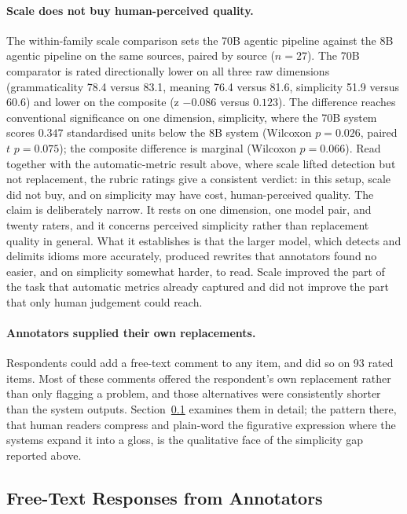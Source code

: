 \paragraph{Scale does not buy human-perceived quality.} The within-family scale comparison sets the 70B agentic pipeline against the 8B agentic pipeline on the same sources, paired by source ($n = 27$). The 70B comparator is rated directionally lower on all three raw dimensions (grammaticality 78.4 versus 83.1, meaning 76.4 versus 81.6, simplicity 51.9 versus 60.6) and lower on the composite (z $-0.086$ versus $0.123$). The difference reaches conventional significance on one dimension, simplicity, where the 70B system scores $0.347$ standardised units below the 8B system (Wilcoxon $p = 0.026$, paired $t$ $p = 0.075$); the composite difference is marginal (Wilcoxon $p = 0.066$). Read together with the automatic-metric result above, where scale lifted detection but not replacement, the rubric ratings give a consistent verdict: in this setup, scale did not buy, and on simplicity may have cost, human-perceived quality. The claim is deliberately narrow. It rests on one dimension, one model pair, and twenty raters, and it concerns perceived simplicity rather than replacement quality in general. What it establishes is that the larger model, which detects and delimits idioms more accurately, produced rewrites that annotators found no easier, and on simplicity somewhat harder, to read. Scale improved the part of the task that automatic metrics already captured and did not improve the part that only human judgement could reach.

\paragraph{Annotators supplied their own replacements.} Respondents could add a free-text comment to any item, and did so on 93 rated items. Most of these comments offered the respondent's own replacement rather than only flagging a problem, and those alternatives were consistently shorter than the system outputs. Section~\ref{subsec:rq3-qualitative} examines them in detail; the pattern there, that human readers compress and plain-word the figurative expression where the systems expand it into a gloss, is the qualitative face of the simplicity gap reported above.

\subsection{Free-Text Responses from Annotators}
\label{subsec:rq3-qualitative}

